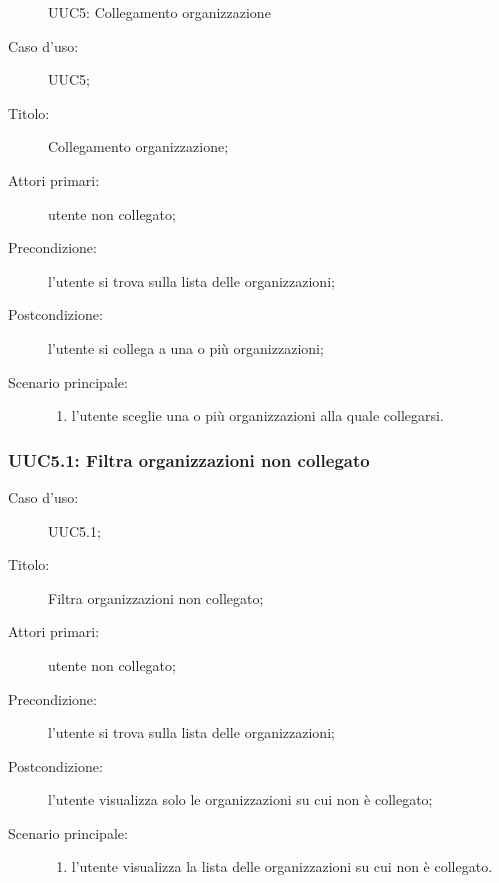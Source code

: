 \documentclass[../../../analisi-dei-requisiti.tex]{subfiles}
\begin{document}
\begin{figure}[H]
  \centering
  \caption{UUC5: Collegamento organizzazione}%
  \label{fig:uuc5}
\end{figure}

\begin{description}
  \item[Caso d’uso:] UUC5;
  \item[Titolo:] Collegamento organizzazione;
  \item[Attori primari:] utente non collegato;
  \item[Precondizione:] l'utente si trova sulla lista delle organizzazioni;
  \item[Postcondizione:] l'utente si collega a una o più organizzazioni;
  \item[Scenario principale:]
        \begin{enumerate}
          \item l'utente sceglie una o più organizzazioni alla quale collegarsi.
        \end{enumerate}
\end{description}


\subsubsection{UUC5.1: Filtra organizzazioni non collegato}%
\begin{description}
  \item[Caso d’uso:] UUC5.1;
  \item[Titolo:] Filtra organizzazioni non collegato;
  \item[Attori primari:] utente non collegato;
  \item[Precondizione:] l'utente si trova sulla lista delle organizzazioni;
  \item[Postcondizione:] l'utente visualizza solo le organizzazioni su cui non è collegato;
  \item[Scenario principale:]
        \begin{enumerate}
          \item l'utente visualizza la lista delle organizzazioni su cui non è collegato.
        \end{enumerate}
\end{description}
\end{document}
